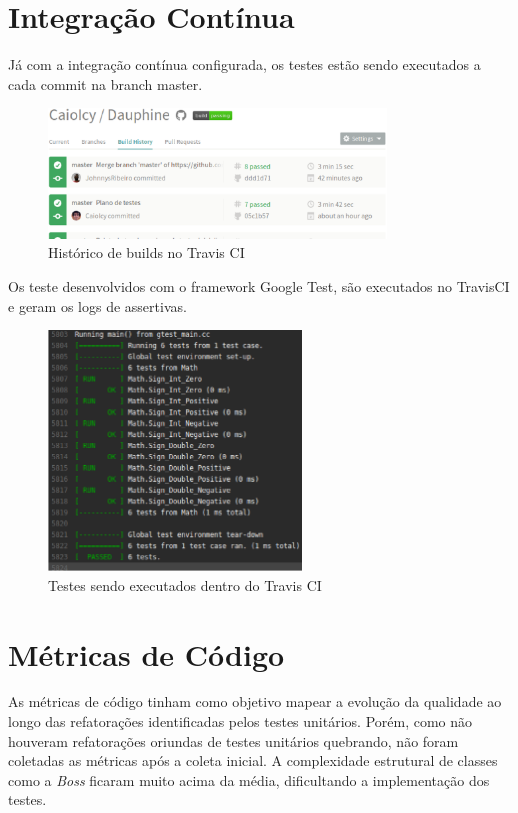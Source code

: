 \section {Integração Contínua}

Já com a integração contínua configurada, os testes estão sendo executados a cada commit na branch master.

\begin{figure}[h]
	\centering
	\includegraphics[width=0.8\textwidth]{figuras/vv_travis.eps}
	\caption{Histórico de builds no Travis CI}
	\label{img:travis}
\end{figure}

Os teste desenvolvidos com o framework Google Test, são executados no TravisCI e geram os logs de assertivas.

\newpage

\begin{figure}[h]
	\centering
	\includegraphics[width=0.6\textwidth]{figuras/vv_travis_tests.eps}
	\caption{Testes sendo executados dentro do Travis CI}
	\label{img:travis_tests}
\end{figure}

\section {Métricas de Código}

As métricas de código tinham como objetivo mapear a evolução da qualidade ao longo das refatorações identificadas pelos testes unitários. Porém, como não houveram refatorações oriundas de testes unitários quebrando, não foram coletadas as métricas após a coleta inicial. A complexidade estrutural de classes como a \textit{Boss} ficaram muito acima da média, dificultando a implementação dos testes.

